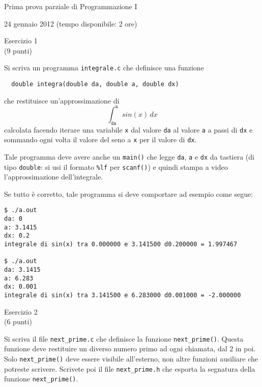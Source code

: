 \documentclass[italian,12pt]{article}
\begin{document}
\begin{center}{\LARGE Prima prova parziale di Programmazione I}\\
\begin{center}
  \Large 24 gennaio 2012 (tempo disponibile: 2 ore)
\end{center}
\end{center}
\begin{center}{\Large Esercizio 1}\\
($9$ punti)
\end{center}
Si scriva un programma \texttt{integrale.c} che definisce una funzione
\begin{verbatim}
  double integra(double da, double a, double dx)
\end{verbatim}
che restituisce un'approssimazione di
\[
  \int_{\mathtt{da}}^{\mathtt{a}}\mathit{sin}(x)\,\mathit{dx}
\]
calcolata facendo iterare una variabile \texttt{x} dal valore \texttt{da} al valore \texttt{a}
a passi di \texttt{dx} e sommando ogni volta il valore del seno a \texttt{x} per il valore di \texttt{dx}.

Tale programma deve avere anche un \texttt{main()} che legge \texttt{da}, \texttt{a} e \texttt{dx}
da tastiera (di tipo \texttt{double}: si usi il formato \texttt{\%lf} per \texttt{scanf()}) e quindi
stampa a video l'approssimazione dell'integrale.
 
Se tutto \`e corretto, tale programma si deve comportare ad esempio come segue:
%
{\small
\begin{verbatim}
$ ./a.out
da: 0
a: 3.1415
dx: 0.2
integrale di sin(x) tra 0.000000 e 3.141500 d0.200000 = 1.997467

$ ./a.out
da: 3.1415
a: 6.283
dx: 0.001
integrale di sin(x) tra 3.141500 e 6.283000 d0.001000 = -2.000000
\end{verbatim}
}
%
\begin{center}{\Large Esercizio 2}\\
($6$ punti)
\end{center}
%
Si scriva il file \texttt{next\_prime.c} che definisce la funzione
\texttt{next\_prime()}. Questa funzione deve restituire un diverso numero primo
ad ogni chiamata, dal $2$ in poi. Solo \texttt{next\_prime()} deve
essere visibile all'esterno, non altre funzioni ausiliare che potreste
scrivere. Scrivete poi il file \texttt{next\_prime.h} che esporta
la segnatura della funzione \texttt{next\_prime()}.
\end{document}
